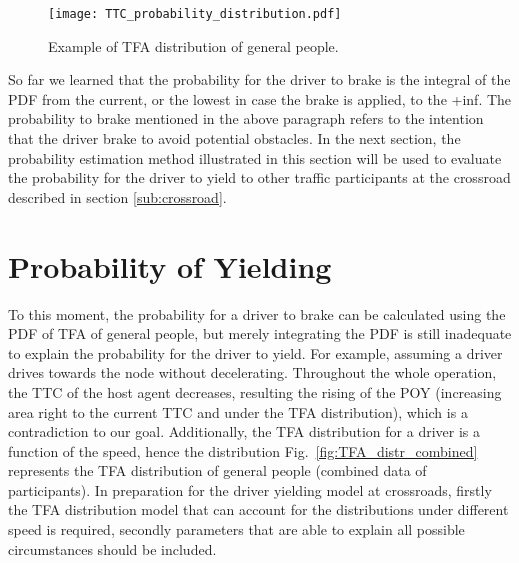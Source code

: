 \begin{figure}[htbp!]
\begin{center}
\texttt{[image: TTC\_probability\_distribution.pdf]}
\end{center}
\caption{Example of TFA distribution of general people.}
\label{fig:TTC_distribution} 
\end{figure}

So far we learned that the probability for the driver to brake is the integral of the PDF from the current, or the lowest in case the brake is applied, to the +inf. The probability to brake mentioned in the above paragraph refers to the intention that the driver brake to avoid potential obstacles. In the next section, the probability estimation method illustrated in this section will be used to evaluate the probability for the driver to yield to other traffic participants at the crossroad described in section \ref{sub:crossroad}.


\section{ Probability of Yielding}
\label{sec:POY}

To this moment, the probability for a driver to brake can be calculated using the PDF of TFA of general people, but merely integrating the PDF is still inadequate to explain the probability for the driver to yield. For example, assuming a driver drives towards the node without decelerating. Throughout the whole operation, the TTC of the host agent decreases, resulting the rising of the \ac{POY} (increasing area right to the current TTC and under the TFA distribution), which is a contradiction to our goal. Additionally, the TFA distribution for a driver is a function of the speed, hence the distribution Fig.~\ref{fig:TFA_distr_combined} represents the TFA distribution of general people (combined data of participants). In preparation for the driver yielding model at crossroads, firstly the TFA distribution model that can account for the distributions under different  speed is required, secondly parameters that are able to explain all possible circumstances should be included.   



